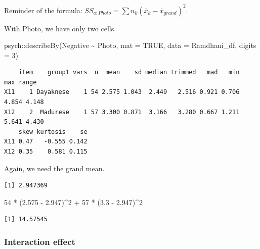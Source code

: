 \documentclass[
  11pt,
]{book}
\newenvironment{Shaded}{\begin{snugshade}}{\end{snugshade}}
\newcommand{\AttributeTok}[1]{\textcolor[rgb]{0.77,0.63,0.00}{#1}}
\newcommand{\ConstantTok}[1]{\textcolor[rgb]{0.00,0.00,0.00}{#1}}
\newcommand{\DecValTok}[1]{\textcolor[rgb]{0.00,0.00,0.81}{#1}}
\newcommand{\FloatTok}[1]{\textcolor[rgb]{0.00,0.00,0.81}{#1}}
\newcommand{\FunctionTok}[1]{\textcolor[rgb]{0.00,0.00,0.00}{#1}}
\newcommand{\NormalTok}[1]{#1}
\newcommand{\SpecialCharTok}[1]{\textcolor[rgb]{0.00,0.00,0.00}{#1}}
\begin{document}
Reminder of the formula: \(SS_{a:Photo}= \sum n_{k}(\bar{x}_{k}-\bar{x}_{grand})^{2}\).

With Photo, we have only two cells.

\begin{Shaded}
\begin{Highlighting}[]
\NormalTok{psych}\SpecialCharTok{::}\FunctionTok{describeBy}\NormalTok{(Negative }\SpecialCharTok{\textasciitilde{}}\NormalTok{ Photo, }\AttributeTok{mat =} \ConstantTok{TRUE}\NormalTok{, }\AttributeTok{data =}\NormalTok{ Ramdhani\_df, }\AttributeTok{digits =} \DecValTok{3}\NormalTok{)}
\end{Highlighting}
\end{Shaded}

\begin{verbatim}
    item    group1 vars  n  mean    sd median trimmed   mad   min   max range
X11    1 Dayaknese    1 54 2.575 1.043  2.449   2.516 0.921 0.706 4.854 4.148
X12    2  Madurese    1 57 3.300 0.871  3.166   3.280 0.667 1.211 5.641 4.430
    skew kurtosis    se
X11 0.47   -0.555 0.142
X12 0.35    0.581 0.115
\end{verbatim}

Again, we need the grand mean.

\begin{Shaded}
\end{Shaded}

\begin{verbatim}
[1] 2.947369
\end{verbatim}

\begin{Shaded}
\begin{Highlighting}[]
\DecValTok{54} \SpecialCharTok{*}\NormalTok{ (}\FloatTok{2.575} \SpecialCharTok{{-}} \FloatTok{2.947}\NormalTok{)}\SpecialCharTok{\^{}}\DecValTok{2} \SpecialCharTok{+} \DecValTok{57} \SpecialCharTok{*}\NormalTok{ (}\FloatTok{3.3} \SpecialCharTok{{-}} \FloatTok{2.947}\NormalTok{)}\SpecialCharTok{\^{}}\DecValTok{2}
\end{Highlighting}
\end{Shaded}

\begin{verbatim}
[1] 14.57545
\end{verbatim}

\hypertarget{interaction-effect}{%
\subsubsection{Interaction effect}\label{interaction-effect}}
\end{document}
